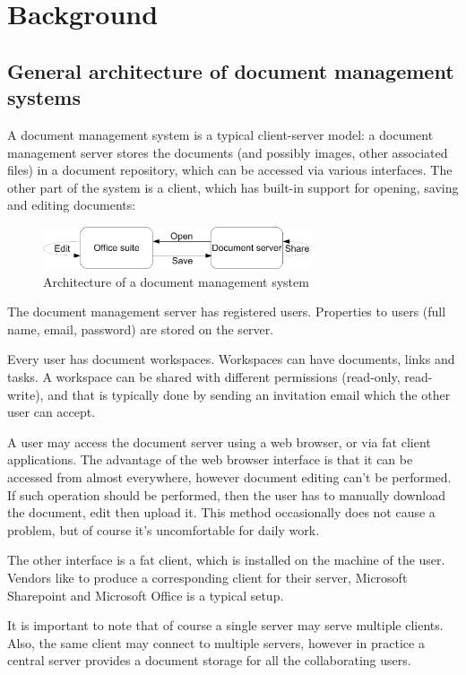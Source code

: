 \section{Background}

\subsection{General architecture of document management systems}

A document management system is a typical client-server model: a document
management server stores the documents (and possibly images, other associated
files) in a document repository, which can be accessed via various interfaces.
The other part of the system is a client, which has built-in support for
opening, saving and editing documents:

\begin{figure}[H]
\centering
\includegraphics[width=300px,keepaspectratio]{general-arch-of-doc-mgmt-systems.pdf}
\caption{Architecture of a document management system}
\end{figure}

The document management server has registered users. Properties to users (full
name, email, password) are stored on the server.

Every user has document workspaces. Workspaces can have documents, links and
tasks. A workspace can be shared with different permissions (read-only,
read-write), and that is typically done by sending an invitation email which
the other user can accept.

A user may access the document server using a web browser, or via fat client
applications. The advantage of the web browser interface is that it can be
accessed from almost everywhere, however document editing can't be performed.
If such operation should be performed, then the user has to manually download
the document, edit then upload it. This method occasionally does not cause a
problem, but of course it's uncomfortable for daily work.

The other interface is a fat client, which is installed on the machine of the
user. Vendors like to produce a corresponding client for their server,
Microsoft Sharepoint and Microsoft Office is a typical setup.

It is important to note that of course a single server may serve multiple
clients. Also, the same client may connect to multiple servers, however in
practice a central server provides a document storage for all the collaborating
users.

